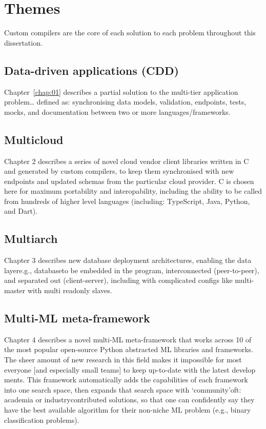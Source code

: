 \section{Themes}

Custom compilers are the core of each solution to each problem throughout this dissertation.

\subsection{Data-driven applications (CDD)}

Chapter~\ref{chap:01} describes a partial solution to the multi-tier application problem\ldots{} defined as: synchronising data models, validation, endpoints, tests, mocks, and documentation between two or more languages/frameworks.

\subsection{Multicloud}

Chapter 2 describes a series of novel cloud vendor client libraries written in C and generated by custom compilers, to keep them synchronised with new endpoints and updated schemas from the particular cloud provider. C is chosen here for maximum portability and interopability, including the ability to be called from hundreds of higher level languages (including: TypeScript, Java, Python, and Dart).

\subsection{Multiarch}

Chapter 3 describes new database deployment architectures, enabling the data layer\textemdash{}e.g., database\textemdash{}to be embedded in the program, interconnected (peer-to-peer), and separated out (client-server), including with complicated configs like multi-master with multi readonly slaves.

\subsection{Multi-ML meta-framework}

Chapter 4 describes a novel multi-ML meta-framework that works across 10 of the most popular open-source Python abstracted ML libraries and frameworks. The sheer amount of new research in this field makes it impossible for most everyone [and especially small teams] to keep up-to-date with the latest develop\\ments. This framework automatically adds the capabilities of each framework into one search space, then expands that search space with `community'\textemdash{}oft: academia or industry\textemdash{}contributed solutions, so that one can confidently say they have the best available algorithm for their non-niche ML problem (e.g., binary classification problems).


